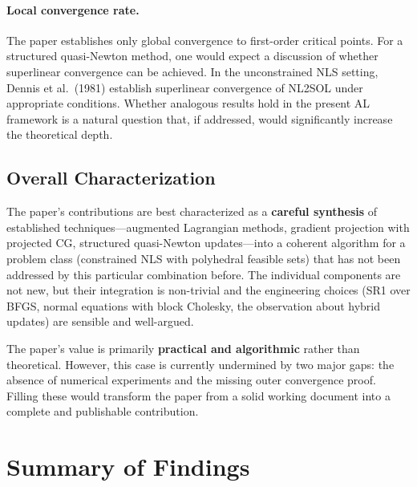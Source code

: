 \documentclass[11pt]{article}
\theoremstyle{plain}
\begin{document}
\paragraph{Local convergence rate.} The paper establishes only global convergence to first-order critical points. For a structured quasi-Newton method, one would expect a discussion of whether superlinear convergence can be achieved. In the unconstrained NLS setting, Dennis et al.\ (1981) establish superlinear convergence of NL2SOL under appropriate conditions. Whether analogous results hold in the present AL framework is a natural question that, if addressed, would significantly increase the theoretical depth.

\subsection{Overall Characterization}

The paper's contributions are best characterized as a \textbf{careful synthesis} of established techniques---augmented Lagrangian methods, gradient projection with projected CG, structured quasi-Newton updates---into a coherent algorithm for a problem class (constrained NLS with polyhedral feasible sets) that has not been addressed by this particular combination before. The individual components are not new, but their integration is non-trivial and the engineering choices (SR1 over BFGS, normal equations with block Cholesky, the observation about hybrid updates) are sensible and well-argued.

The paper's value is primarily \textbf{practical and algorithmic} rather than theoretical. However, this case is currently undermined by two major gaps: the absence of numerical experiments and the missing outer convergence proof. Filling these would transform the paper from a solid working document into a complete and publishable contribution.


\section{Summary of Findings}\label{sec:summary}
\end{document}
